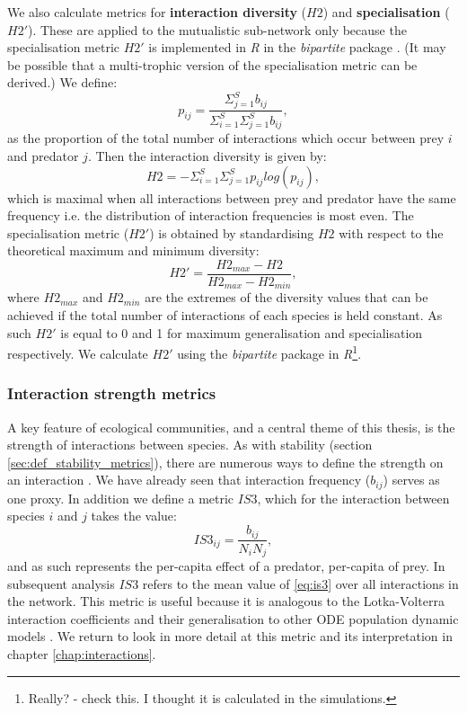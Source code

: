 We also calculate metrics for \textbf{interaction diversity} ($H2$) and \textbf{specialisation} ($H2'$). These are applied to the mutualistic sub-network only because the specialisation metric $H2'$ is implemented in \emph{R} in the \emph{bipartite} package \cite{dormann2008introducing}. (It may be possible that a multi-trophic version of the specialisation metric can be derived.) We define:
\begin{equation}
p_{ij} = \frac{\Sigma_{j=1}^S b_{ij}}{ \Sigma_{i=1}^S \Sigma_{j=1}^S b_{ij}},
\end{equation} 
%
as the proportion of the total number of interactions which occur between prey $i$ and predator $j$. Then the interaction diversity is given by:
\begin{equation}
H2 = - \Sigma_{i=1}^S \Sigma_{j=1}^S p_{ij} log(p_{ij}),
\label{eq:h2}
\end{equation}
%
which is maximal when all interactions between prey and predator have the same frequency i.e. the distribution of interaction frequencies is most even. The specialisation metric ($H2'$) is obtained by standardising $H2$ with respect to the theoretical maximum and minimum diversity:
\begin{equation}
H2' = \frac{H2_{max} - H2}{H2_{max} - H2_{min}},
\label{eq:h2_prime}
\end{equation}
% 
where $H2_{max}$ and $H2_{min}$ are the extremes of the diversity values that can be achieved if the total number of interactions of each species is held constant. As such $H2'$ is equal to 0 and 1 for maximum generalisation and specialisation respectively. We calculate $H2'$ using the \emph{bipartite} package in \emph{R}\footnote{Really? - check this. I thought it is calculated in the simulations.}.


\subsubsection{Interaction strength metrics}

A key feature of ecological communities, and a central theme of this thesis, is the strength of interactions between species. As with stability (section \ref{sec:def_stability_metrics}), there are numerous ways to define the strength on an interaction \cite{berlow2004interaction}. We have already seen that interaction frequency ($b_{ij}$) serves as one proxy. In addition we define a metric $IS3$, which for the interaction between species $i$ and $j$ takes the value:
\begin{equation}
IS3_{ij} = \frac{b_{ij}}{N_iN_j},
\label{eq:is3}
\end{equation}
%
and as such represents the per-capita effect of a predator, per-capita of prey. In subsequent analysis $IS3$ refers to the mean value of \eqref{eq:is3} over all interactions in the network. This metric is useful because it is analogous to the Lotka-Volterra interaction coefficients and their generalisation to other ODE population dynamic models \cite{berlow2004interaction}. We return to look in more detail at this metric and its interpretation in chapter \ref{chap:interactions}.
